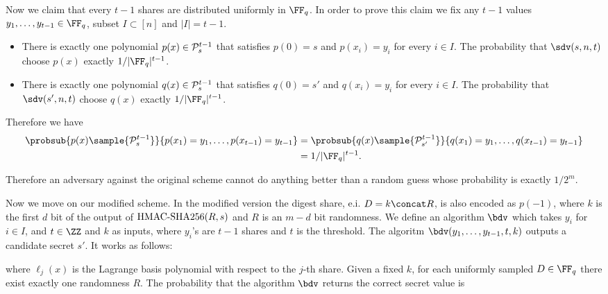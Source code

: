 \documentclass[envcountsame,runningheads,notitlepage]{llncs}
\begin{document}
	
	Now we claim that every $t-1$ shares are distributed uniformly in $\FF_q$. 
	In order to prove this claim we fix any $t-1$ values $y_1, \ldots, y_{t-1} \in \FF_q$, subset  $I \subset [n]$ and $|I| = t-1$. 
	\begin{itemize}
	 	\item There is exactly one polynomial $p(x) \in {\mathcal P}_{s}^{t - 1}$ that satisfies $p(0) = s$ and $p(x_{i}) = y_{i}$ for every $i \in I$. 
	 	The probability that $\sdv(s, n, t)$ choose $p(x)$ exactly $1/|\FF_q|^{t-1}$.
	 	\item There is exactly one polynomial $q(x) \in {\mathcal P}_{s}^{t - 1}$ that satisfies $q(0) = s'$ and $q(x_{i}) = y_{i}$ for every $i \in I$. 
	 	The probability that $\sdv(s', n, t)$ choose $q(x)$ exactly $1/|\FF_q|^{t-1}$.
	\end{itemize}
	Therefore we have
	\begin{align*}
		\probsub{p(x) \sample {\sP_{s}^{t - 1}}}{p(x_1) = y_1, \ldots, p(x_{t-1}) = y_{t-1}} &= \probsub{q(x) \sample {\sP_{s'}^{t - 1}}}{q(x_1) = y_1, \ldots, q(x_{t-1}) = y_{t-1}} \\
		&= 1/|\FF_q|^{t-1}.
	\end{align*}
	
	Therefore an adversary against the original scheme cannot do anything better than a random guess whose probability is exactly $1/2^m$.
	
	Now we move on our modified scheme. 	
	In the modified version the digest share, e.i. $D = k \concat R$, is also encoded as $p(-1)$, where  $k$ is the first $d$ bit of the output of ${\textrm{HMAC-SHA256}}(R, s)$ and $R$ is an $m - d$ bit randomness. 
	We define an algorithm $\bdv$ which takes $y_i$ for $i \in I$, and $t \in \ZZ$ and $k$ as inputs, where $y_i$'s are $t - 1$ shares and $t$ is the threshold.
	The algoritm $\bdv(y_1, \ldots, y_{t-1}, t, k)$ outputs a candidate secret $s'$. It works as follows:
	
	where $\ell_{j}(x)$ is the  Lagrange basis polynomial with respect to the $j$-th share.
	Given a fixed $k$, for each uniformly sampled $D \in \FF_q$ there exist exactly one randomness $R$.  
	The probability that the algorithm $\bdv$ returns the correct secret value is 
	
\end{document}
